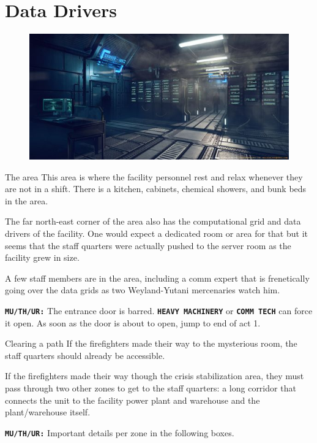 \clearpage

\section{Data Drivers}


\begin{figure}
    \centering
    \includegraphics[width=.45\textwidth]{img/bg/server.jpg}
\end{figure}


\begin{rpg-commentbox}{The area}
    This area is where the facility personnel rest and relax whenever they are not in a shift. There is a kitchen, cabinets, chemical showers, and bunk beds in the area. 
    
    The far north-east corner of the area also has the computational grid and data drivers of the facility. One would expect a dedicated room or area for that but it seems that the staff quarters were actually pushed to the server room as the facility grew in size. 

    A few staff members are in the area, including a comm expert that is frenetically going over the data grids as two Weyland-Yutani mercenaries watch him. 

    \texttt{\textbf{MU/TH/UR:}} The entrance door is barred. \texttt{\textbf{HEAVY MACHINERY}} or \texttt{\textbf{COMM TECH}} can force it open. As soon as the door is about to open, jump to end of act 1.
\end{rpg-commentbox}  


\begin{rpg-commentbox}{Clearing a path}
    If the firefighters made their way to the mysterious room, the staff quarters should already be accessible. 

    If the firefighters made their way though the crisis stabilization area, they must pass through two other zones to get to the staff quarters: a long corridor that connects the unit to the facility power plant and warehouse and the plant/warehouse itself. 
    
    \texttt{\textbf{MU/TH/UR:}} Important details per zone in the following boxes.
\end{rpg-commentbox}



